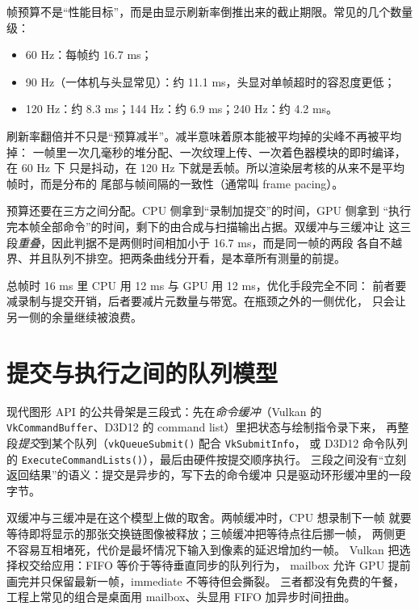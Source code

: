 \documentclass[12pt,a4paper,fontset=fandol]{ctexbook}
\newcommand{\Fn}[1]{\texttt{#1()}}
\newcommand{\Tp}[1]{\texttt{#1}}
\newcommand{\Lang}[1]{\textsf{#1}}
\newcommand{\DomCPU}{\Lang{CPU}}
\newcommand{\DomGPU}{\Lang{GPU}}
\begin{document}
帧预算不是``性能目标''，而是由显示刷新率倒推出来的截止期限。常见的几个数量级：

\begin{itemize}
  \item 60 Hz：每帧约 16.7 ms；
  \item 90 Hz（一体机与头显常见）：约 11.1 ms，头显对单帧超时的容忍度更低；
  \item 120 Hz：约 8.3 ms；144 Hz：约 6.9 ms；240 Hz：约 4.2 ms。
\end{itemize}

刷新率翻倍并不只是``预算减半''。减半意味着原本能被平均掉的尖峰不再被平均掉：
一帧里一次几毫秒的堆分配、一次纹理上传、一次着色器模块的即时编译，在 60 Hz 下
只是抖动，在 120 Hz 下就是丢帧。所以渲染层考核的从来不是平均帧时，而是分布的
尾部与帧间隔的一致性（通常叫 frame pacing）。

预算还要在三方之间分配。\DomCPU{} 侧拿到``录制加提交''的时间，\DomGPU{} 侧拿到
``执行完本帧全部命令''的时间，剩下的由合成与扫描输出占据。双缓冲与三缓冲让
这三段\emph{重叠}，因此判据不是两侧时间相加小于 16.7 ms，而是同一帧的两段
各自不越界、并且队列不排空。把两条曲线分开看，是本章所有测量的前提。

\begin{warning}[title={只看一个总帧时会误诊}]
总帧时 16 ms 里 \DomCPU{} 用 12 ms 与 \DomGPU{} 用 12 ms，优化手段完全不同：
前者要减录制与提交开销，后者要减片元数量与带宽。在瓶颈之外的一侧优化，
只会让另一侧的余量继续被浪费。
\end{warning}

\section{提交与执行之间的队列模型}

现代图形 API 的公共骨架是三段式：先在\emph{命令缓冲}（Vulkan 的
\Tp{VkCommandBuffer}、D3D12 的 command list）里把状态与绘制指令录下来，
再整段\emph{提交}到某个队列（\Fn{vkQueueSubmit} 配合 \Tp{VkSubmitInfo}，
或 D3D12 命令队列的 \Fn{ExecuteCommandLists}），最后由硬件按提交顺序执行。
三段之间没有``立刻返回结果''的语义：提交是异步的，写下去的命令缓冲
只是驱动环形缓冲里的一段字节。

双缓冲与三缓冲是在这个模型上做的取舍。两帧缓冲时，\DomCPU{} 想录制下一帧
就要等待即将显示的那张交换链图像被释放；三帧缓冲把等待点往后挪一帧，
两侧更不容易互相堵死，代价是最坏情况下输入到像素的延迟增加约一帧。
Vulkan 把选择权交给应用：FIFO 等价于等待垂直同步的队列行为，
mailbox 允许 \DomGPU{} 提前画完并只保留最新一帧，immediate 不等待但会撕裂。
三者都没有免费的午餐，工程上常见的组合是桌面用 mailbox、头显用 FIFO
加异步时间扭曲。
\end{document}

